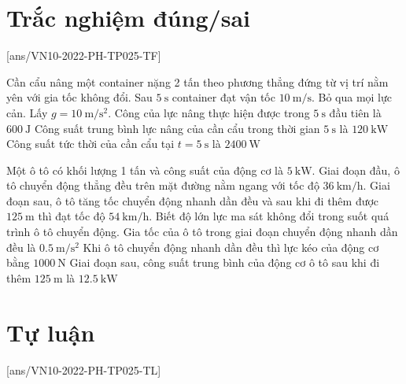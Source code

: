 \section{Trắc nghiệm đúng/sai}
\setcounter{ex}{0}
[ans/VN10-2022-PH-TP025-TF]
\begin{ex}
	Cần cẩu nâng một container nặng 2 tấn theo phương thẳng đứng từ vị trí nằm yên với gia tốc không đổi. Sau $\SI{5}{\second}$ container đạt vận tốc $\SI{10}{\meter/\second}$. Bỏ qua mọi lực cản. Lấy $g=\SI{10}{\meter/\second^2}$.
	{Công của lực nâng thực hiện được trong $\SI{5}{\second}$ đầu tiên là $\SI{600}{\joule}$}
	{\True Công suất trung bình lực nâng của cần cẩu trong thời gian $\SI{5}{\second}$ là $\SI{120}{\kilo\watt}$}
	{Công suất tức thời của cần cẩu tại $t=\SI{5}{\second}$ là $\SI{2400}{\watt}$}
\end{ex}
\begin{ex}
	Một ô tô có khối lượng 1 tấn và công suất của động cơ là $\SI{5}{\kilo\watt}$. Giai đoạn đầu, ô tô chuyển động thẳng đều trên mặt đường nằm ngang với tốc độ $\SI{36}{\kilo\meter/\hour}$. Giai đoạn sau, ô tô tăng tốc chuyển động nhanh dần đều và sau khi đi thêm được $\SI{125}{\meter}$ thì đạt tốc độ $\SI{54}{\kilo\meter/\hour}$. Biết độ lớn lực ma sát không đổi trong suốt quá trình ô tô chuyển động.
	{\True Gia tốc của ô tô trong giai đoạn chuyển động nhanh dần đều là $\SI{0.5}{\meter/\second^2}$}
	{\True Khi ô tô chuyển động nhanh dần đều thì lực kéo của động cơ bằng $\SI{1000}{\newton}$}
	{\True Giai đoạn sau, công suất trung bình của động cơ ô tô sau khi đi thêm $\SI{125}{\meter}$ là $\SI{12.5}{\kilo\watt}$}
	\loigiai{}
\end{ex}
\section{Tự luận}
\setcounter{ex}{0}
[ans/VN10-2022-PH-TP025-TL]

